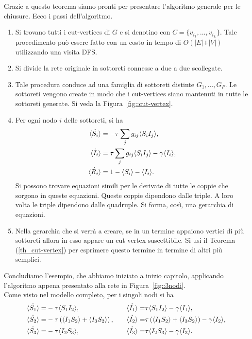 Grazie a questo teorema siamo pronti per presentare l'algoritmo generale per le chiusure. Ecco i passi dell'algoritmo.
\begin{enumerate}
	\item Si trovano tutti i cut-vertices di $G$ e si denotino con $C=\{ v_{i_1}, \dots, v_{i_L}\}$. Tale procedimento pu\`o essere fatto con  un costo in tempo di $O(\vert E \vert + \vert V \vert)$ utilizzando una visita DFS. 
	\item Si divide la rete originale in sottoreti connesse a due a due scollegate.
	\item Tale procedura conduce ad una famiglia di sottoreti distinte $G_1, \dots, G_P$. Le sottoreti vengono create in modo che i cut-vertices siano mantenuti in tutte le sottoreti generate. Si veda la Figura~\ref{fig::cut-vertex}.
	\item Per ogni nodo $i$ delle sottoreti, si ha 
	\begin{equation*}
	\begin{aligned}
\dot{\langle S_i \rangle} &= -\tau \sum_j g_{ij} \langle S_iI_j \rangle,\\
\dot{\langle I_i \rangle} &= \tau \sum_j g_{ij} \langle S_iI_j \rangle-\gamma\langle I_i \rangle,\\
\dot{\langle R_i \rangle} &= 1 -\langle S_i \rangle -\langle I_i \rangle.
		\end{aligned}
	\end{equation*}
	Si possono trovare  equazioni simili per le derivate di tutte le coppie che sorgono in queste equazioni. Queste coppie dipendono dalle triple. A loro volta le triple dipendono dalle quadruple. Si forma, cos\`i, una gerarchia di equazioni.
	\item Nella gerarchia che si verr\`a a creare, se in un termine appaiono   vertici di pi\`u sottoreti allora in esso appare un cut-vertex suscettibile. Si usi il Teorema (\ref{th_cut-vertex}) per esprimere questo termine    in termine di altri pi\`u semplici.
\end{enumerate}
\newpage
Concludiamo l'esempio, che abbiamo iniziato a inizio capitolo, applicando l'algoritmo appena presentato alla rete in Figura~\ref{fig::3nodi}.\\
Come visto nel modello completo, per i singoli nodi si ha \begin{equation*}
\begin{aligned}
	\dot{\langle S_1 \rangle} = & -\tau \langle  S_1 I_2 \rangle, 
\quad &
	\dot{\langle I_1 \rangle} = & \tau \langle S_1 I_2 \rangle-\gamma \langle I_1 \rangle, 
\\
	\dot{\langle S_2 \rangle} = & -\tau \left(  \langle  I_1 S_2 \rangle + \langle I_3S_2 \rangle \right),	
\quad & 
	\dot{\langle I_2 \rangle} = & \tau \left(  \langle  I_1 S_2 \rangle + \langle I_3S_2 \rangle \right)-\gamma \langle I_2 \rangle,
\\
	\dot{\langle S_3 \rangle} = & -\tau \langle  I_2 S_3 \rangle,
\quad & 
	\dot{\langle I_3 \rangle} = & \tau \langle  I_2 S_3 \rangle-\gamma \langle I_3 \rangle.
 \end{aligned}
\end{equation*}
